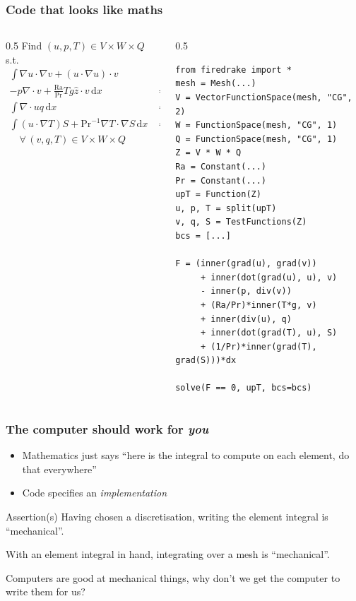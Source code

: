 \documentclass[presentation,aspectratio=43, 10pt]{beamer}
\begin{document}
\begin{frame}[fragile]
  \frametitle{Code that looks like maths}
  \begin{columns}
    \begin{column}{0.5\framewidth}
      {\footnotesize
        Find $(u, p, T) \in V\times W\times Q$ s.t.
        \begin{align*}
          \int\!\nabla u \cdot \nabla v + (u \cdot \nabla u) \cdot v \\
          - p\nabla\cdot v + \frac{\text{Ra}}{\text{Pr}} Tg \hat{z} \cdot v\,\text{d}x &= 0 \\
          \int\!\nabla\cdot u q\,\text{d}x&= 0\\
          \int\! (u\cdot \nabla T) S + \text{Pr}^{-1} \nabla T \cdot \nabla
          S\,\text{d}x &= 0\\
          \quad \forall\, (v,q,T) \in V\times W \times Q
        \end{align*}
        }
    \end{column}
      \begin{column}{0.5\framewidth}
\begin{verbatim}
from firedrake import *
mesh = Mesh(...)
V = VectorFunctionSpace(mesh, "CG", 2)
W = FunctionSpace(mesh, "CG", 1)
Q = FunctionSpace(mesh, "CG", 1)
Z = V * W * Q
Ra = Constant(...)
Pr = Constant(...)
upT = Function(Z)
u, p, T = split(upT)
v, q, S = TestFunctions(Z)
bcs = [...]

F = (inner(grad(u), grad(v))
     + inner(dot(grad(u), u), v)
     - inner(p, div(v))
     + (Ra/Pr)*inner(T*g, v)
     + inner(div(u), q)
     + inner(dot(grad(T), u), S)
     + (1/Pr)*inner(grad(T), grad(S)))*dx

solve(F == 0, upT, bcs=bcs)
\end{verbatim}
      \end{column}
  \end{columns}
\end{frame}

\begin{frame}
  \frametitle{The computer should work for \emph{you}}
  \begin{itemize}
  \item Mathematics just says ``here is the integral to compute on each
    element, do that everywhere''
  \item Code specifies an \emph{implementation}
  \end{itemize}
  \begin{block}{Assertion(s)}
    Having chosen a discretisation, writing the element integral is ``mechanical''.

    With an element integral in hand, integrating over a mesh is
    ``mechanical''.
  \end{block}

  \begin{corollary}
    Computers are good at mechanical things, why don't we get the
    computer to write them for us?
  \end{corollary}
\end{frame}
\end{document}
